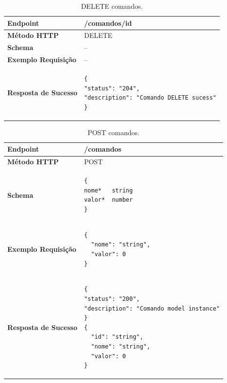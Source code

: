 \begin{apendicesenv}
\begin{table}[H]
\begin{tabular}{|l|l|}
\hline
\textbf{Endpoint}            & /comandos/{id} \\ \hline
\textbf{Método HTTP}         & DELETE \\ \hline
\textbf{Schema}              & -- \\ \hline
\textbf{Exemplo Requisição}  & -- \\ \hline
\textbf{Resposta de Sucesso} &
\begin{lstlisting}
{
"status": "204",
"description": "Comando DELETE sucess"
}
\end{lstlisting}
\\ \hline
\end{tabular}
\caption{DELETE comandos.}
\label{delete_comandos}
\end{table}


\begin{table}[H]
\begin{tabular}{|l|l|}
\hline
\textbf{Endpoint}            & /comandos \\ \hline
\textbf{Método HTTP}         & POST \\ \hline
\textbf{Schema}              & 
\begin{lstlisting}
{
nome*	string
valor*	number
}
\end{lstlisting} \\ \hline
\textbf{Exemplo Requisição}  & 
\begin{lstlisting}
{
  "nome": "string",
  "valor": 0
}
\end{lstlisting} \\ \hline
\textbf{Resposta de Sucesso} &
\begin{lstlisting}
{
"status": "200",
"description": "Comando model instance"
}
{
  "id": "string",
  "nome": "string",
  "valor": 0
}
\end{lstlisting}
\\ \hline
\end{tabular}
\caption{POST comandos.}
\label{post_comandos}
\end{table}



\end{apendicesenv}
